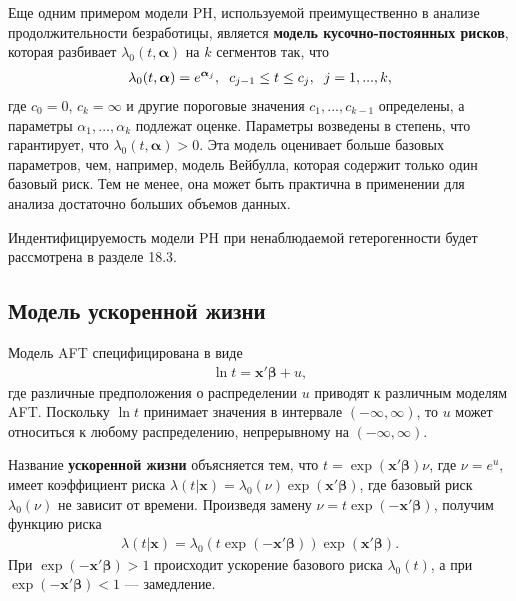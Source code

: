 Еще одним примером модели PH, используемой преимущественно в анализе продолжительности безработицы, является \textbf{модель кусочно-постоянных рисков}, которая разбивает $\lambda_0(t,\bm{\alpha})$ на $k$ сегментов так, что
        \begin{align}
        \label{eq:17.22}
        \lambda_0(t,\bm{\alpha})=e^{\bm{\alpha}_j}, \hspace{0.2cm} c_{j-1}\le t\le c_j, \hspace{0.2cm} j=1,...,k,
        \end{align}
где $c_0=0$, $c_k=\infty$ и другие пороговые значения $c_1,...,c_{k-1}$ определены, а параметры $\alpha_1,...,\alpha_k$ подлежат оценке. Параметры возведены в степень, что гарантирует, что $\lambda_0(t,\bm{\alpha})>0.$ Эта модель оценивает больше базовых параметров, чем, например, модель Вейбулла, которая содержит только один базовый риск. Тем не менее, она может быть практична в применении для анализа достаточно больших объемов данных.

Индентифицируемость модели PH при ненаблюдаемой гетерогенности
будет рассмотрена в разделе 18.3. %


\subsection{Модель ускоренной жизни}\label{sec:17.7.2}

\noindent
Модель AFT специфицирована в виде
        \begin{align}
        \label{eq:17.23}
        \ln t=\mathbf{x}'\bm{\beta}+u,
        \end{align}
где различные предположения о распределении $u$ приводят к различным моделям AFT. Поскольку $\ln t$ принимает значения в интервале $(-\infty,\infty)$, то $u$ может относиться к любому распределению, непрерывному на $(-\infty,\infty)$.

Название \textbf{ускоренной жизни} объясняется тем, что $t=\exp(\mathbf{x}'\bm{\beta})\nu$, где $\nu=e^u$, имеет коэффициент риска $\lambda(t|\mathbf{x})=\lambda_0(\nu)\exp(\mathbf{x}'\bm{\beta})$, где базовый риск $\lambda_0(\nu)$ не зависит от времени. Произведя замену $\nu=t\exp(-\mathbf{x}'\bm{\beta})$, получим функцию риска
        \begin{align}
            \label{eq:17.24}
            \lambda(t|\mathbf{x})=\lambda_0(t\exp(-\mathbf{x}'\bm{\beta}))\exp(\mathbf{x}'\bm{\beta}).
        \end{align}
При $\exp(-\mathbf{x}'\bm{\beta})>1$ происходит ускорение базового риска $\lambda_0(t)$, а при $\exp(-\mathbf{x}'\bm{\beta})<1$ --- замедление.

